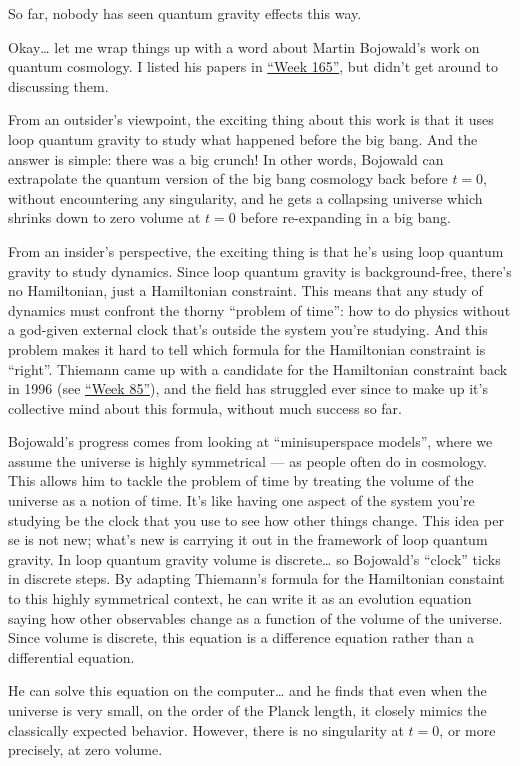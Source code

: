 \documentclass{article}
\begin{document}
So far, nobody has seen quantum gravity effects this way.

Okay\ldots{} let me wrap things up with a word about Martin Bojowald's
work on quantum cosmology. I listed his papers in
\protect\hyperlink{week165}{``Week 165''}, but didn't get around to
discussing them.

From an outsider's viewpoint, the exciting thing about this work is that
it uses loop quantum gravity to study what happened before the big bang.
And the answer is simple: there was a big crunch! In other words,
Bojowald can extrapolate the quantum version of the big bang cosmology
back before \(t = 0\), without encountering any singularity, and he gets
a collapsing universe which shrinks down to zero volume at \(t = 0\)
before re-expanding in a big bang.

From an insider's perspective, the exciting thing is that he's using
loop quantum gravity to study dynamics. Since loop quantum gravity is
background-free, there's no Hamiltonian, just a Hamiltonian constraint.
This means that any study of dynamics must confront the thorny ``problem
of time'': how to do physics without a god-given external clock that's
outside the system you're studying. And this problem makes it hard to
tell which formula for the Hamiltonian constraint is ``right''. Thiemann
came up with a candidate for the Hamiltonian constraint back in 1996
(see \protect\hyperlink{week85}{``Week 85''}), and the field has
struggled ever since to make up it's collective mind about this formula,
without much success so far.

Bojowald's progress comes from looking at ``minisuperspace models'',
where we assume the universe is highly symmetrical --- as people often
do in cosmology. This allows him to tackle the problem of time by
treating the volume of the universe as a notion of time. It's like
having one aspect of the system you're studying be the clock that you
use to see how other things change. This idea per se is not new; what's
new is carrying it out in the framework of loop quantum gravity. In loop
quantum gravity volume is discrete\ldots{} so Bojowald's ``clock'' ticks
in discrete steps. By adapting Thiemann's formula for the Hamiltonian
constaint to this highly symmetrical context, he can write it as an
evolution equation saying how other observables change as a function of
the volume of the universe. Since volume is discrete, this equation is a
difference equation rather than a differential equation.

He can solve this equation on the computer\ldots{} and he finds that
even when the universe is very small, on the order of the Planck length,
it closely mimics the classically expected behavior. However, there is
no singularity at \(t = 0\), or more precisely, at zero volume.
\end{document}

